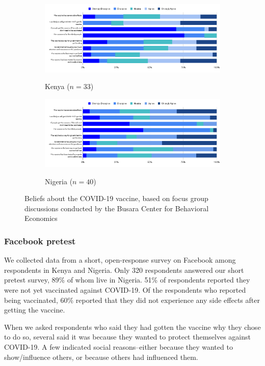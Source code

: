 \documentclass[letterpaper, 12pt, parskip=full,DIV=10]{scrartcl}
\begin{document}
\begin{figure}[htbp]
   \centering
   \begin{subfigure}{\textwidth}
  \centering
  \caption{Kenya ($n = 33$)}
  \includegraphics[width = \textwidth]{../../tables-figures/qual-beliefsKY.png} 
  \label{fig:qualKY}
\end{subfigure}
\begin{subfigure}{\textwidth}
  \centering
  \caption{Nigeria ($n = 40$)}
  \includegraphics[width = \textwidth]{../../tables-figures/qual-beliefsNG.png} 
  \label{fig:qualNG}
\end{subfigure}
   \caption{Beliefs about the COVID-19 vaccine, based on focus group discussions conducted by the Busara Center for Behavioral Economics}
   \label{fig:qual}
\end{figure}


\subsubsection{Facebook pretest}
We collected data from a short, open-response survey on Facebook among respondents in Kenya and Nigeria. Only 320 respondents answered our short pretest survey, 89\% of whom live in Nigeria. 51\% of respondents reported they were not yet vaccinated against COVID-19. Of the respondents who reported being vaccinated, 60\% reported that they did not experience any side effects after getting the vaccine.

When we asked respondents who said they had gotten the vaccine why they chose to do so, several said it was because they wanted to protect themselves against COVID-19. A few indicated social reasons--either because they wanted to show/influence others, or because others had influenced them.
\end{document}
